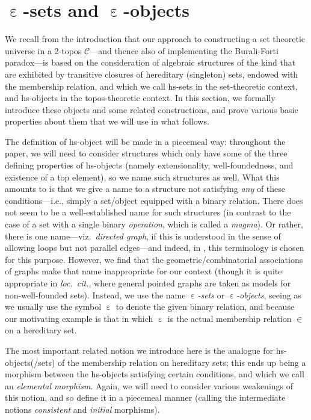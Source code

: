 \documentclass{amsart}
\newcommand\alttext{\texorpdfstring}
\newcommand\cC{\mathcal{C}}
\newcommand\ein{\mathrel{\varepsilon}}
\newcommand\loccit{\textit{loc.~cit.}}
\newcommand\unein{{\ein}}
\theoremstyle{definition}
\theoremstyle{remark}
\theoremstyle{plainwithref}
\begin{document}
\section{\alttext{\( \unein \)}{ε}-sets and \alttext{\( \unein \)}{ε}-objects} \label{sec:ein-objects}
We recall from the introduction that our approach to constructing a set theoretic universe in a 2-topos \( \cC \)---and thence also of implementing the Burali-Forti paradox---is based on the consideration of algebraic structures of the kind that are exhibited by transitive closures of hereditary (singleton) sets, endowed with the membership relation, and which we call hs-sets in the set-theoretic context, and hs-objects in the topos-theoretic context.
In this section, we formally introduce these objects and some related constructions, and prove various basic properties about them that we will use in what follows.

The definition of hs-object will be made in a piecemeal way: throughout the paper, we will need to consider structures which only have some of the three defining properties of hs-objects (namely extensionality, well-foundedness, and existence of a top element), so we name such structures as well.
What this amounts to is that we give a name to a structure not satisfying \emph{any} of these conditions---i.e., simply a set/object equipped with a binary relation.
There does not seem to be a well-established name for such structures (in contrast to the case of a set with a single binary \emph{operation}, which is called a \emph{magma}).
Or rather, there is one name---viz.\ \emph{directed graph}, if this is understood in the sense of allowing loops but not parallel edges---and indeed, in \cite{aczel-non-well-founded-sets}, this terminology is chosen for this purpose.
However, we find that the geometric/combinatorial associations of graphs make that name inappropriate for our context (though it is quite appropriate in \loccit, where general pointed graphs are taken as models for non-well-founded sets).
Instead, we use the name \emph{\( \unein \)-sets} or \emph{\( \unein \)-objects}, seeing as we usually use the symbol \( \unein \) to denote the given binary relation, and because our motivating example is that in which \( \unein \) is the actual membership relation \( \in \) on a hereditary set.

The most important related notion we introduce here is the analogue for hs-objects(/sets) of the membership relation on hereditary sets; this ends up being a morphism between the hs-objects satisfying certain conditions, and which we call an \emph{elemental morphism}.
Again, we will need to consider various weakenings of this notion, and so define it in a piecemeal manner (calling the intermediate notions \emph{consistent} and \emph{initial} morphisms).
\end{document}
